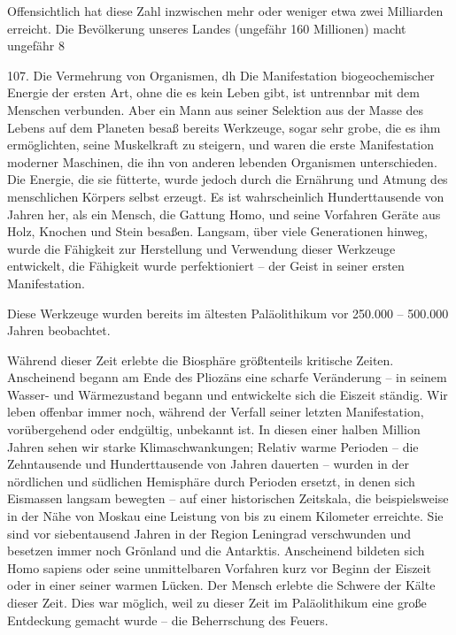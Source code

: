 \documentclass[11pt,a4paper]{book}
\begin{document}
Offensichtlich hat diese Zahl inzwischen mehr oder weniger etwa zwei Milliarden erreicht. Die Bevölkerung unseres Landes (ungefähr 160 Millionen) macht ungefähr 8%



107. Die Vermehrung von Organismen, dh Die Manifestation biogeochemischer Energie der ersten Art, ohne die es kein Leben gibt, ist untrennbar mit dem Menschen verbunden. Aber ein Mann aus seiner Selektion aus der Masse des Lebens auf dem Planeten besaß bereits Werkzeuge, sogar sehr grobe, die es ihm ermöglichten, seine Muskelkraft zu steigern, und waren die erste Manifestation moderner Maschinen, die ihn von anderen lebenden Organismen unterschieden. Die Energie, die sie fütterte, wurde jedoch durch die Ernährung und Atmung des menschlichen Körpers selbst erzeugt. Es ist wahrscheinlich Hunderttausende von Jahren her, als ein Mensch, die Gattung Homo, und seine Vorfahren Geräte aus Holz, Knochen und Stein besaßen. Langsam, über viele Generationen hinweg, wurde die Fähigkeit zur Herstellung und Verwendung dieser Werkzeuge entwickelt, die Fähigkeit wurde perfektioniert -- der Geist in seiner ersten Manifestation.



Diese Werkzeuge wurden bereits im ältesten Paläolithikum vor 250.000 -- 500.000 Jahren beobachtet.



Während dieser Zeit erlebte die Biosphäre größtenteils kritische Zeiten. Anscheinend begann am Ende des Pliozäns eine scharfe Veränderung -- in seinem Wasser- und Wärmezustand begann und entwickelte sich die Eiszeit ständig. Wir leben offenbar immer noch, während der Verfall seiner letzten Manifestation, vorübergehend oder endgültig, unbekannt ist. In diesen einer halben Million Jahren sehen wir starke Klimaschwankungen; Relativ warme Perioden -- die Zehntausende und Hunderttausende von Jahren dauerten -- wurden in der nördlichen und südlichen Hemisphäre durch Perioden ersetzt, in denen sich Eismassen langsam bewegten -- auf einer historischen Zeitskala, die beispielsweise in der Nähe von Moskau eine Leistung von bis zu einem Kilometer erreichte. Sie sind vor siebentausend Jahren in der Region Leningrad verschwunden und besetzen immer noch Grönland und die Antarktis. Anscheinend bildeten sich Homo sapiens oder seine unmittelbaren Vorfahren kurz vor Beginn der Eiszeit oder in einer seiner warmen Lücken. Der Mensch erlebte die Schwere der Kälte dieser Zeit. Dies war möglich, weil zu dieser Zeit im Paläolithikum eine große Entdeckung gemacht wurde -- die Beherrschung des Feuers.
\end{document}

